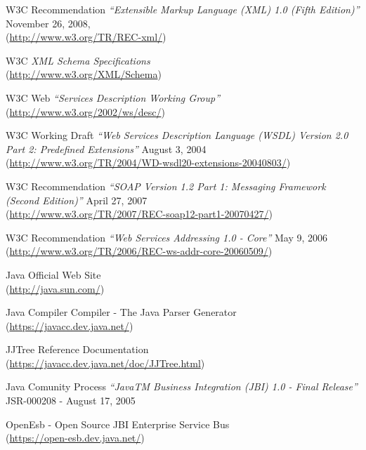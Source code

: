 \begin{thebibliography}{99}
 W3C Recommendation \emph{``Extensible Markup Language (XML) 1.0
(Fifth Edition)''} November 26, 2008,\\
(\href{http://www.w3.org/TR/REC-xml/}{http://www.w3.org/TR/REC-xml/})

 W3C \emph{XML Schema Specifications}\\
(\href{http://www.w3.org/XML/Schema}{http://www.w3.org/XML/Schema})

 W3C Web \emph{``Services Description Working Group''}\\
(\href{http://www.w3.org/2002/ws/desc/}{http://www.w3.org/2002/ws/desc/})

 W3C Working Draft \emph{``Web Services Description
Language (WSDL) Version 2.0 Part 2: Predefined Extensions''} August 3, 2004 \\
(\href{http://www.w3.org/TR/2004/WD-wsdl20-extensions-20040803/}{http://www.w3.org/TR/2004/WD-wsdl20-extensions-20040803/})


 W3C Recommendation \emph{``SOAP Version 1.2 Part 1: Messaging
Framework (Second Edition)''} April 27, 2007\\
(\href{http://www.w3.org/TR/2007/REC-soap12-part1-20070427/}{http://www.w3.org/TR/2007/REC-soap12-part1-20070427/})

  W3C Recommendation \emph{``Web Services Addressing 1.0
- Core''} May 9, 2006 \\
(\href{http://www.w3.org/TR/2006/REC-ws-addr-core-20060509/}{http://www.w3.org/TR/2006/REC-ws-addr-core-20060509/})

 Java Official Web Site \\ 
(\href{http://java.sun.com/}{http://java.sun.com/})

 Java Compiler Compiler - The Java Parser
Generator \\ (\href{https://javacc.dev.java.net/}{https://javacc.dev.java.net/})

 JJTree Reference Documentation\\
(\href{https://javacc.dev.java.net/doc/JJTree.html}{https://javacc.dev.java.net/doc/JJTree.html})

 Java Comunity Process \emph{``JavaTM Business Integration (JBI)
1.0 - Final Release''} JSR-000208 - August 17, 2005

 OpenEsb - Open Source JBI Enterprise Service Bus \\
(\href{https://open-esb.dev.java.net/}{https://open-esb.dev.java.net/})


\end{thebibliography}
